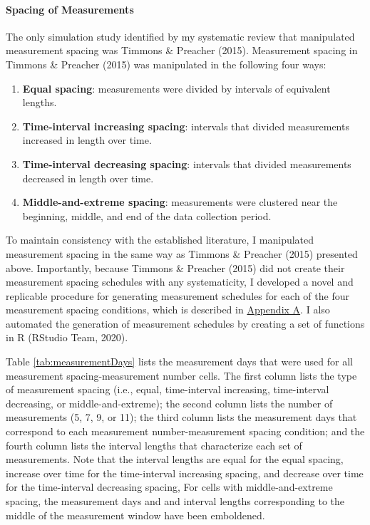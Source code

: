 \documentclass[
12pt, %
twoside,
english]{guelphthesis}
\theoremstyle{definition}
\theoremstyle{definition}
\theoremstyle{definition}
\theoremstyle{definition}
\theoremstyle{remark}
\begin{document}
\hypertarget{spacing-measurements}{%
\paragraph{Spacing of Measurements}\label{spacing-measurements}}

The only simulation study identified by my systematic review that manipulated measurement spacing was
Timmons \& Preacher (2015). Measurement spacing in Timmons \& Preacher (2015) was manipulated in the
following four ways:
\begin{enumerate}
\def\labelenumi{\arabic{enumi})}
\item
  \textbf{Equal spacing}: measurements were divided by intervals of
  equivalent lengths.
\item
  \textbf{Time-interval increasing spacing}: intervals that divided measurements
  increased in length over time.
\item
  \textbf{Time-interval decreasing spacing}: intervals that divided measurements
  decreased in length over time.
\item
  \textbf{Middle-and-extreme spacing}: measurements were clustered near the
  beginning, middle, and end of the data collection period.
\end{enumerate}
\noindent To maintain consistency with the established literature, I manipulated measurement spacing in the same way as Timmons \& Preacher (2015) presented above. Importantly, because Timmons \& Preacher (2015) did not create their measurement spacing schedules with any systematicity, I developed a novel and replicable procedure for generating measurement schedules for each of the four measurement spacing conditions, which is described in \protect\hyperlink{appendix-A}{Appendix A}. I also automated the generation of measurement schedules by creating a set of functions in R (RStudio Team, 2020).

Table \ref{tab:measurementDays} lists the measurement days that were
used for all measurement spacing-measurement number cells. The first
column lists the type of measurement spacing (i.e., equal, time-interval
increasing, time-interval decreasing, or middle-and-extreme); the second
column lists the number of measurements (5, 7, 9, or 11); the third
column lists the measurement days that correspond to each measurement
number-measurement spacing condition; and the fourth column lists the
interval lengths that characterize each set of measurements. Note that
the interval lengths are equal for the equal spacing, increase over time
for the time-interval increasing spacing, and decrease over time for the
time-interval decreasing spacing, For cells with middle-and-extreme
spacing, the measurement days and and interval lengths corresponding to
the middle of the measurement window have been emboldened.
\end{document}
